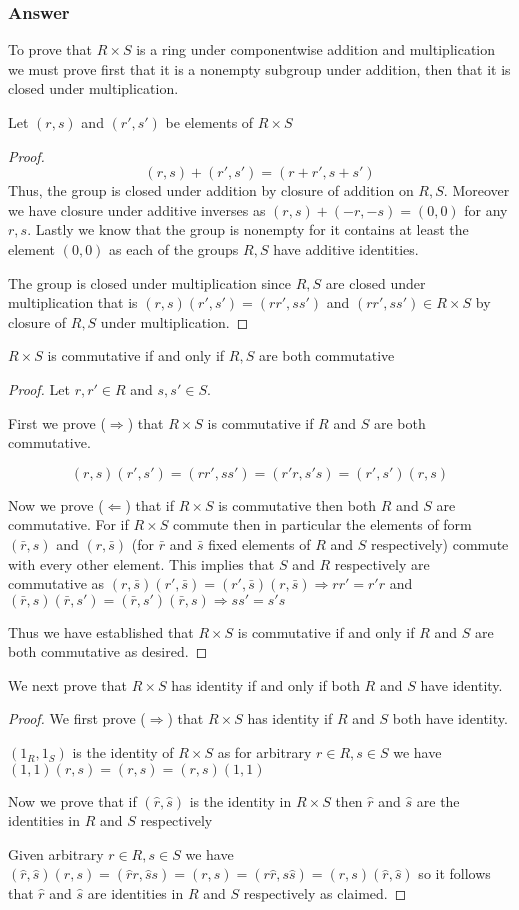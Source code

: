 \documentclass[12pt]{article}
\begin{document}
\subsubsection{Answer}
To prove that $R \times S$ is a ring under componentwise addition and multiplication we must prove first that it is a nonempty subgroup under addition, then that it is closed under multiplication.

Let $(r,s)$ and $(r',s')$ be elements of $R \times S$
\begin{proof}
\[(r,s)+(r',s')=(r+r',s+s')\]
Thus, the group is closed under addition by closure of addition on $R, S$. Moreover we have closure under additive inverses as $(r,s)+(-r,-s)=(0,0)$ for any $r,s$. Lastly we know that the group is nonempty for it contains at least the element $(0,0)$ as each of the groups $R, S$ have additive identities.

The group is closed under multiplication since $R,S$ are closed under multiplication that is $(r,s)(r',s')=(rr',ss')$ and $(rr',ss')\in R\times S$ by closure of $R,S$ under multiplication.\end{proof}

$R \times S$ is commutative if and only if $R,S$ are both commutative
\begin{proof}
Let $r,r' \in R$ and $s,s' \in S$.

First we prove ($\Rightarrow$) that $R \times S$ is commutative if $R$ and $S$ are both commutative. 

\[(r,s)(r',s')=(rr',ss')=(r'r,s's)=(r',s')(r,s)\]

Now we prove ($\Leftarrow$) that if $R \times S$ is commutative then both $R$ and $S$ are commutative. For if $R \times S$ commute then in particular the elements of form $(\bar{r},s)$ and $(r,\bar{s})$ (for $\bar{r}$ and $\bar{s}$ fixed elements of $R$ and $S$ respectively) commute with every other element. This implies that $S$ and $R$ respectively are commutative as $(r,\bar{s})(r',\bar{s})=(r',\bar{s})(r,\bar{s}) \Rightarrow rr'=r'r$ and $(\bar{r},s)(\bar{r},s')=(\bar{r},s')(\bar{r},s) \Rightarrow ss'=s's$

Thus we have established that $R \times S$ is commutative if and only if $R$ and $S$ are both commutative as desired.\end{proof}

We next prove that $R \times S$ has identity if and only if both $R$ and $S$ have identity.

\begin{proof}
We first prove ($\Rightarrow$) that $R \times S$ has identity if $R$ and $S$ both have identity.

$(1_R,1_S)$ is the identity of $R \times S$ as for arbitrary $r \in R, s \in S$ we have $(1,1)(r,s)=(r,s)=(r,s)(1,1)$

Now we prove that if $(\hat{r},\hat{s})$ is the identity in $R \times S$ then $\hat{r}$ and $\hat{s}$ are the identities in $R$ and $S$ respectively

Given arbitrary $r \in R, s \in S$ we have $(\hat{r},\hat{s})(r,s)=(\hat{r}r,\hat{s}s)=(r,s)=(r\hat{r},s\hat{s})=(r,s)(\hat{r},\hat{s})$ so it follows that $\hat{r}$ and $\hat{s}$ are identities in $R$ and $S$ respectively as claimed.\end{proof}
\end{document}
